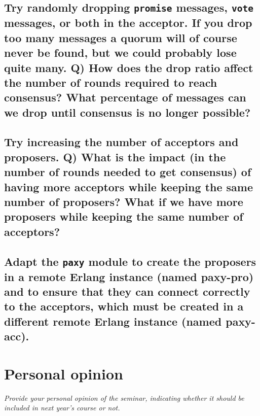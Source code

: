 \documentclass[a4paper, 10pt]{article}
\begin{document}
\subsection{Try randomly dropping \texttt{promise} messages, \texttt{vote} messages, or both in the acceptor. If you drop too many messages a quorum will of course never be found, but we could probably lose quite many. Q) How does the drop ratio affect the number of rounds required to reach consensus? What percentage of messages can we drop until consensus is no longer possible?}

\subsection{Try increasing the number of acceptors and proposers. Q) What is the impact (in the number of rounds needed to get consensus) of having more acceptors while keeping the same number of proposers? What if we have more proposers while keeping the same number of acceptors?}

\subsection{Adapt the \texttt{paxy} module to create the proposers in a remote Erlang instance (named paxy-pro) and to ensure that they can connect correctly to the
acceptors, which must be created in a different remote Erlang instance (named
paxy-acc).}

\section{Personal opinion}

\textit{Provide your personal opinion of the seminar, indicating whether it should be included in next year's course or not.}
\end{document}
